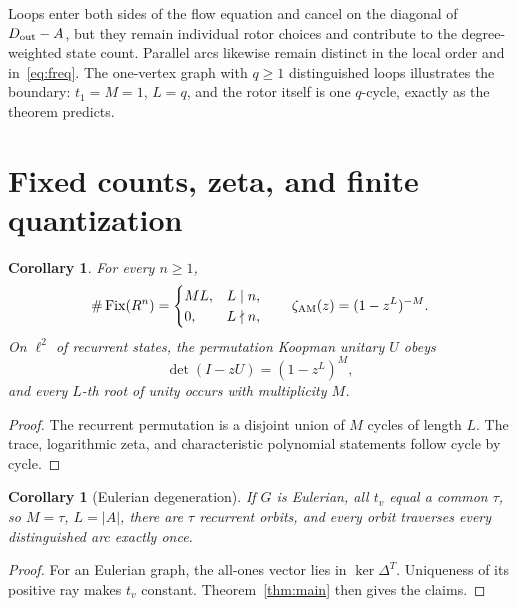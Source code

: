 \documentclass[10pt]{article}
\newtheorem{corollary}[theorem]{Corollary}
\newcommand{\Fix}{\operatorname{Fix}}
\begin{document}
Loops enter both sides of the flow equation and cancel on the diagonal of
$D_{\rm out}-A$, but they remain individual rotor choices and contribute to
the degree-weighted state count.  Parallel arcs likewise remain distinct in
the local order and in~\eqref{eq:freq}.  The one-vertex graph with $q\ge1$
distinguished loops illustrates the boundary: $t_1=M=1$, $L=q$, and the
rotor itself is one $q$-cycle, exactly as the theorem predicts.

\section{Fixed counts, zeta, and finite quantization}
\begin{corollary}\label{cor:spectral}
For every $n\ge1$,
\[
 \#\Fix(R^n)=\begin{cases}ML,&L\mid n,\\0,&L\nmid n,\end{cases}
 \qquad \zeta_{\rm AM}(z)=(1-z^L)^{-M}.
\]
On $\ell^2$ of recurrent states, the permutation Koopman unitary $U$ obeys
\[
 \det(I-zU)=(1-z^L)^M,
\]
and every $L$-th root of unity occurs with multiplicity $M$.
\end{corollary}
\begin{proof}
The recurrent permutation is a disjoint union of $M$ cycles of length $L$.
The trace, logarithmic zeta, and characteristic polynomial statements follow
cycle by cycle.
\end{proof}

\begin{corollary}[Eulerian degeneration]\label{cor:euler}
If $G$ is Eulerian, all $t_v$ equal a common $\tau$, so $M=\tau$, $L=|A|$,
there are $\tau$ recurrent orbits, and every orbit traverses every
distinguished arc exactly once.
\end{corollary}
\begin{proof}
For an Eulerian graph, the all-ones vector lies in $\ker\Delta^T$.  Uniqueness
of its positive ray makes $t_v$ constant.  Theorem~\ref{thm:main} then gives
the claims.
\end{proof}
\end{document}
